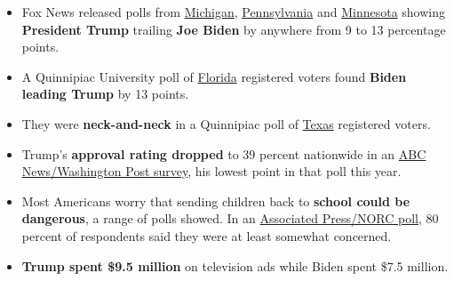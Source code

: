\begin{itemize}
\tightlist
\item
  Fox News released polls from
  \href{https://static.foxnews.com/foxnews.com/content/uploads/2020/07/Fox_July-18-20-2020_Complete_Michigan_Topline_July-23-Release.pdf}{Michigan},
  \href{https://static.foxnews.com/foxnews.com/content/uploads/2020/07/Fox_July-18-20-2020_Complete_Pennsylvania_Topline_July-23-Release.pdf}{Pennsylvania}
  and
  \href{https://static.foxnews.com/foxnews.com/content/uploads/2020/07/Fox_July-18-20-2020_Complete_Minnesota_Topline_July-23-Release.pdf}{Minnesota}
  showing \textbf{President Trump} trailing \textbf{Joe Biden} by
  anywhere from 9 to 13 percentage points.
\end{itemize}

\begin{itemize}
\tightlist
\item
  A Quinnipiac University poll of
  \href{https://poll.qu.edu/images/polling/fl/fl07232020_fwhb62.pdf}{Florida}
  registered voters found \textbf{Biden leading Trump} by 13 points.
\end{itemize}

\begin{itemize}
\tightlist
\item
  They were \textbf{neck-and-neck} in a Quinnipiac poll of
  \href{https://poll.qu.edu/images/polling/tx/tx07222020_tfmd13.pdf}{Texas}
  registered voters.
\end{itemize}

\begin{itemize}
\tightlist
\item
  Trump's \textbf{approval rating dropped} to 39 percent nationwide in
  an
  \href{https://abcnews.go.com/Politics/pandemic-surge-damages-trump-boosting-bidens-white-house/story?id=71779431\&mc_cid=1ef5cc5cf4\&mc_eid=\%5bUNIQID\%5d}{ABC
  News/Washington Post survey}, his lowest point in that poll this year.
\end{itemize}

\begin{itemize}
\tightlist
\item
  Most Americans worry that sending children back to \textbf{school
  could be dangerous}, a range of polls showed. In an
  \href{https://apnorc.org/projects/concerns-about-school-re-openings-loom-large/}{Associated
  Press/NORC poll}, 80 percent of respondents said they were at least
  somewhat concerned.
\end{itemize}

\begin{itemize}
\tightlist
\item
  \textbf{Trump spent \$9.5 million} on television ads while Biden spent
  \$7.5 million.
\end{itemize}

